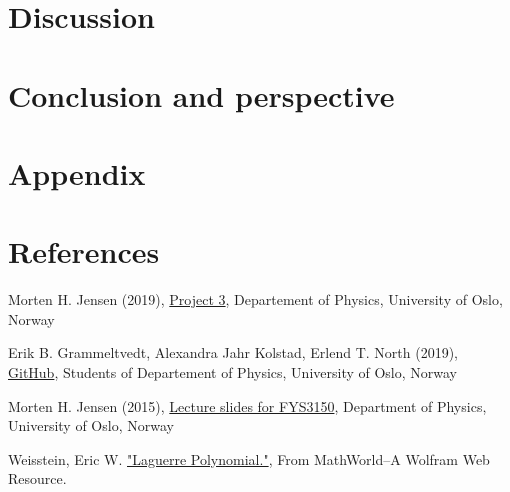 \documentclass{article}
\begin{document}
\vspace{1cm}

\clearpage
\newpage

\section{Discussion} \label{sec:Discussion}




\vspace{1cm}

\section{Conclusion and perspective} \label{sec:Conclusion}



\vspace{1cm}

\section{Appendix} \label{sec:Appendix}





\vspace{1cm}

\section{References} \label{sec:References}

\begin{thebibliography}{}

Morten H. Jensen (2019), \href{https://github.com/CompPhysics/ComputationalPhysics/blob/master/doc/Projects/2019/Project3/pdf/Project3.pdf}{Project 3}, Departement of Physics, University of Oslo, Norway

Erik B. Grammeltvedt, Alexandra Jahr Kolstad, Erlend T. North (2019), \href{https://github.com/Erikbgram/Fys3150}{GitHub}, Students of Departement of Physics, University of Oslo, Norway

Morten H. Jensen (2015), \href{https://github.com/CompPhysics/ComputationalPhysics/blob/master/doc/Lectures/lectures2015.pdf}{Lecture slides for FYS3150}, Department of Physics, University of Oslo, Norway

Weisstein, Eric W. \href{http://mathworld.wolfram.com/LaguerrePolynomial.html}{"Laguerre Polynomial."}, From MathWorld--A Wolfram Web Resource.


\end{thebibliography}




\end{document}
